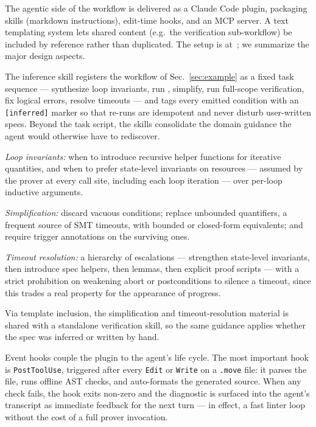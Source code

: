 \label{sec:skills}

The agentic side of the workflow is delivered as a Claude Code plugin, packaging skills (markdown instructions), edit-time hooks, and an MCP server.
A text templating system lets shared content (e.g.\ the verification sub-workflow) be included by reference rather than duplicated. The setup is at~\cite{MoveFlow}; we summarize the major design aspects.

The inference skill registers the workflow of Sec.~\ref{sec:example} as a fixed task sequence --- synthesize loop invariants, run \WP, simplify, run full-scope verification, fix logical errors, resolve timeouts --- and tags every emitted condition with an \texttt{[inferred]} marker so that re-runs are idempotent and never disturb user-written specs.
Beyond the task script, the skills consolidate the domain guidance the agent would otherwise have to rediscover.
\begin{Itemize}
\item \emph{Loop invariants:} when to introduce recursive helper functions for iterative quantities, and when to prefer state-level invariants on resources --- assumed by the prover at every call site, including each loop iteration --- over per-loop inductive arguments.
\item \emph{Simplification:} discard vacuous conditions; replace unbounded quantifiers, a frequent source of SMT timeouts, with bounded or closed-form equivalents; and require trigger annotations on the surviving ones.
\item \emph{Timeout resolution:} a hierarchy of escalations --- strengthen state-level invariants, then introduce spec helpers, then lemmas, then explicit proof scripts --- with a strict prohibition on weakening abort or postconditions to silence a timeout, since this trades a real property for the appearance of progress.
\end{Itemize}
\noindent
Via template inclusion, the simplification and timeout-resolution material is shared with a standalone verification skill, so the same guidance applies whether the spec was inferred or written by hand.

Event hooks couple the plugin to the agent's life cycle.
The most important hook is \texttt{PostToolUse}, triggered after every \texttt{Edit} or \texttt{Write} on a \texttt{.move} file: it parses the file, runs offline AST checks, and auto-formats the generated source.
When any check fails, the hook exits non-zero and the diagnostic is surfaced into the agent's transcript as immediate feedback for the next turn --- in effect, a fast linter loop without the cost of a full prover invocation.

